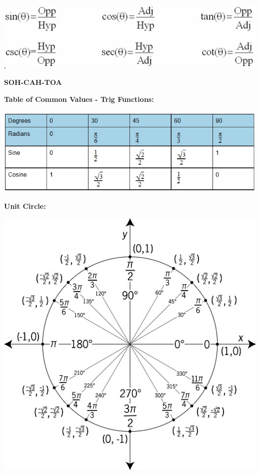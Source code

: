 \documentclass[12pt]{article}
\begin{document}
\centerline{\includegraphics{TrigFunctionsTriangle.jpg}}

\centerline{\textbf{SOH-CAH-TOA}}
\vspace{2cm}
\textbf{Table of Common Values - Trig Functions:}

\centerline{\includegraphics{TrigFunctionsCommonAngles.jpg}}

\newpage

\textbf{Unit Circle:}

\centerline{\includegraphics{UnitCircle.jpg}}
\end{document}
